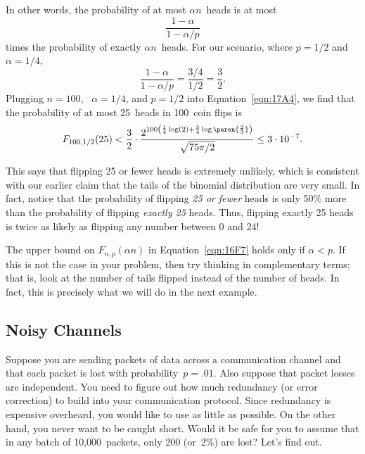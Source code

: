 \begin{editingnotes}
In other words, the probability of at most $\alpha n$~heads is at most
\begin{equation*}
    \frac{1 - \alpha}{1 - \alpha/p}
\end{equation*}
times the probability of exactly $\alpha n$~heads. For our scenario,
where $p = 1/2$ and $\alpha = 1/4$,
\begin{equation*}
\frac{1 - \alpha}{1 - \alpha/p}
    = \frac{3/4}{1/2} %
    = \frac{3}{2}.
\end{equation*}
Plugging $n = 100$, \ $\alpha = 1/4$, and $p = 1/2$ into
Equation~\ref{eqn:17A4}, we find that the probability of at most
25~heads in 100~coin flips is
\begin{equation*}
F_{100, 1/2}(25)
    < \frac{3}{2} \cdot
        \frac{  \displaystyle
                2^{100 \left( \frac{1}{4} \log(2)
                     + \frac{3}{4} \log\paren{\frac{2}{3}} \right) }
             }
             { \sqrt{75 \pi /2} } %
    \le 3 \cdot 10^{-7}.
\end{equation*}

This says that flipping 25 or fewer heads is extremely unlikely, which
is consistent with our earlier claim that the tails of the binomial
distribution are very small.  In fact, notice that the probability of
flipping \emph{25 or fewer} heads is only 50\% more than the
probability of flipping \emph{exactly 25} heads.  Thus, flipping
exactly 25 heads is twice as likely as flipping any number between 0
and 24!

\begin{caveat}
The upper bound on $F_{n, p}(\alpha n)$ in Equation~\ref{eqn:16F7}
holds only if $\alpha < p$.  If this is not the case in your problem,
then try thinking in complementary terms; that is, look at the number
of tails flipped instead of the number of heads.  In fact, this is
precisely what we will do in the next example.
\end{caveat}

\subsection{Noisy Channels}

Suppose you are sending packets of data across a communication channel
and that each packet is lost with probability~$p = .01$.  Also suppose
that packet losses are independent.  You need to figure out how much
redundancy (or error correction) to build into your communication
protocol.  Since redundancy is expensive overheard, you would like to
use as little as possible.  On the other hand, you never want to be
caught short.  Would it be safe for you to assume that in any batch
of 10,000~packets, only 200 (or~2\%) are lost?  Let's find out.


\end{editingnotes}
